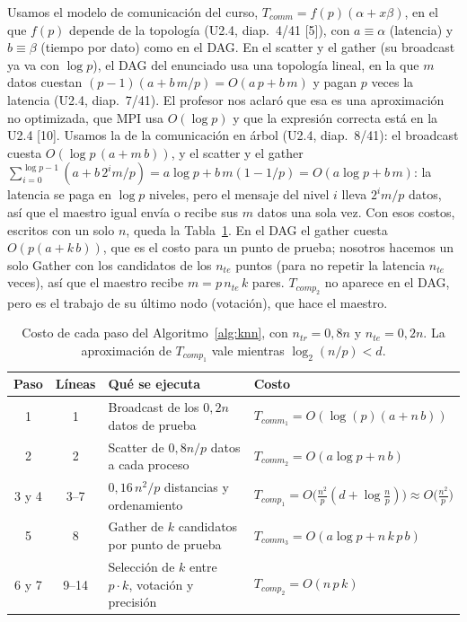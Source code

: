 \documentclass[11pt,a4paper]{article}
\newcommand{\ntr}{n_{tr}}
\newcommand{\nte}{n_{te}}
\begin{document}
Usamos el modelo de comunicación del curso, $T_{comm} = f(p)(\alpha + x\beta)$, en el que $f(p)$ depende de la topología (U2.4, diap.~4/41 [5]), con $a \equiv \alpha$ (latencia) y $b \equiv \beta$ (tiempo por dato) como en el DAG. En el scatter y el gather (su broadcast ya va con $\log p$), el DAG del enunciado usa una topología lineal, en la que $m$ datos cuestan $(p-1)(a + b\,m/p) = O(a\,p + b\,m)$ y pagan $p$ veces la latencia (U2.4, diap.~7/41). El profesor nos aclaró que esa es una aproximación no optimizada, que MPI usa $O(\log p)$ y que la expresión correcta está en la U2.4 [10]. Usamos la de la comunicación en árbol (U2.4, diap.~8/41): el broadcast cuesta $O(\log p\,(a + m\,b))$, y el scatter y el gather $\sum_{i=0}^{\log p-1}(a + b\,2^i m/p) = a\log p + b\,m(1-1/p) = O(a\log p + b\,m)$: la latencia se paga en $\log p$ niveles, pero el mensaje del nivel $i$ lleva $2^i m/p$ datos, así que el maestro igual envía o recibe sus $m$ datos una sola vez. Con esos costos, escritos con un solo $n$, queda la Tabla~\ref{tab:pasos}. En el DAG el gather cuesta $O(p(a + k\,b))$, que es el costo para un punto de prueba; nosotros hacemos un solo Gather con los candidatos de los $\nte$ puntos (para no repetir la latencia $\nte$ veces), así que el maestro recibe $m = p\,\nte\,k$ pares. $T_{comp_2}$ no aparece en el DAG, pero es el trabajo de su último nodo (votación), que hace el maestro.

\begin{table}[!htb]
\centering
\small
\renewcommand{\arraystretch}{1.2}
\begin{tabular}{c c >{\raggedright\arraybackslash}p{5.2cm} l}
\toprule
\textbf{Paso} & \textbf{Líneas} & \textbf{Qué se ejecuta} & \textbf{Costo} \\
\midrule
1 & 1 & Broadcast de los $0{,}2n$ datos de prueba & $T_{comm_1} = O(\log(p)(a + n\, b))$ \\
2 & 2 & Scatter de $0{,}8n/p$ datos a cada proceso & $T_{comm_2} = O(a\log p + n\, b)$ \\
3 y 4 & 3--7 & $0{,}16\,n^2/p$ distancias y ordenamiento & $T_{comp_1} = O\big(\frac{n^2}{p}(d + \log \frac{n}{p})\big) \approx O\big(\frac{n^2}{p}\big)$ \\
5 & 8 & Gather de $k$ candidatos por punto de prueba & $T_{comm_3} = O(a\log p + n\, k\, p\, b)$ \\
6 y 7 & 9--14 & Selección de $k$ entre $p \cdot k$, votación y precisión & $T_{comp_2} = O(n\, p\, k)$ \\
\bottomrule
\end{tabular}
\caption{Costo de cada paso del Algoritmo~\ref{alg:knn}, con $\ntr = 0{,}8n$ y $\nte = 0{,}2n$. La aproximación de $T_{comp_1}$ vale mientras $\log_2(n/p) < d$.}
\label{tab:pasos}
\end{table}
\end{document}
